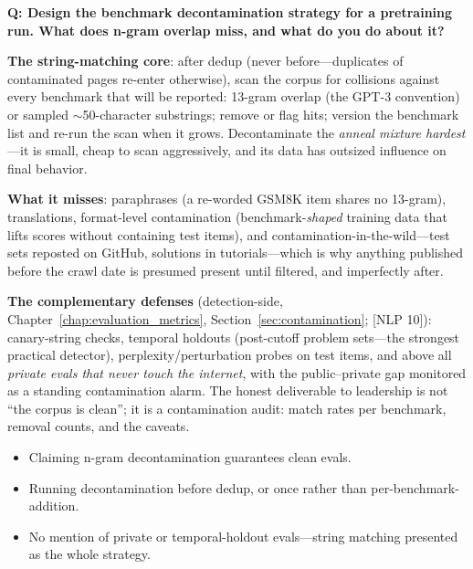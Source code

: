 \begin{interviewq}
\end{interviewq}

\medskip

\begin{interviewq}
\textbf{Q: Design the benchmark decontamination strategy for a pretraining run. What does n-gram overlap miss, and what do you do about it?}

 \quad {} \quad \badgefreq{\freqmed}

\stronganswer
\textbf{The string-matching core}: after dedup (never before---duplicates of contaminated pages re-enter otherwise), scan the corpus for collisions against every benchmark that will be reported: 13-gram overlap (the GPT-3 convention) or sampled $\sim$50-character substrings; remove or flag hits; version the benchmark list and re-run the scan when it grows. Decontaminate the \textit{anneal mixture hardest}---it is small, cheap to scan aggressively, and its data has outsized influence on final behavior.

\textbf{What it misses}: paraphrases (a re-worded GSM8K item shares no 13-gram), translations, format-level contamination (benchmark-\textit{shaped} training data that lifts scores without containing test items), and contamination-in-the-wild---test sets reposted on GitHub, solutions in tutorials---which is why anything published before the crawl date is presumed present until filtered, and imperfectly after.

\textbf{The complementary defenses} (detection-side, Chapter~\ref{chap:evaluation_metrics}, Section~\ref{sec:contamination}; [NLP 10]): canary-string checks, temporal holdouts (post-cutoff problem sets---the strongest practical detector), perplexity/perturbation probes on test items, and above all \textit{private evals that never touch the internet}, with the public--private gap monitored as a standing contamination alarm. The honest deliverable to leadership is not ``the corpus is clean''; it is a contamination audit: match rates per benchmark, removal counts, and the caveats.

\redflags
\begin{itemize}
    \item Claiming n-gram decontamination guarantees clean evals.
    \item Running decontamination before dedup, or once rather than per-benchmark-addition.
    \item No mention of private or temporal-holdout evals---string matching presented as the whole strategy.
\end{itemize}


\end{interviewq}
